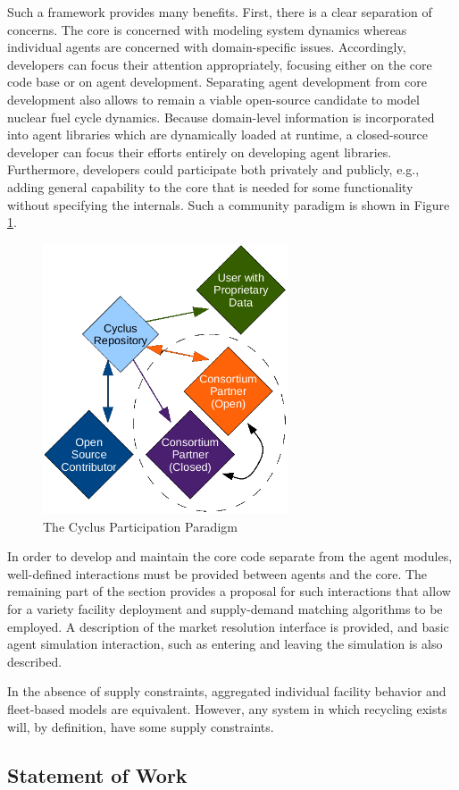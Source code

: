Such a framework provides many benefits. First, there is a clear separation of
concerns. The \Cyclus core is concerned with modeling system dynamics whereas
individual agents are concerned with domain-specific issues. Accordingly,
developers can focus their attention appropriately, focusing either on the core
code base or on agent development. Separating agent development from core
development also allows \Cyclus to remain a viable open-source candidate to
model nuclear fuel cycle dynamics. Because domain-level information is
incorporated into agent libraries which are dynamically loaded at runtime, a
closed-source developer can focus their efforts entirely on developing agent
libraries. Furthermore, developers could participate both privately and
publicly, e.g., adding general capability to the \Cyclus core that is needed for
some functionality without specifying the internals. Such a community paradigm
is shown in Figure \ref{fig:community}.

\begin{figure}[htbp!]
  \begin{center}
    \includegraphics[height=8cm]{./figs/community.png}
  \end{center}
  \caption{The Cyclus Participation Paradigm} 
  \label{fig:community}
\end{figure}

In order to develop and maintain the core code separate from the agent modules,
well-defined interactions must be provided between agents and the \Cyclus
core. The remaining part of the section provides a proposal for such
interactions that allow for a variety facility deployment and supply-demand
matching algorithms to be employed. A description of the market resolution
interface is provided, and basic agent simulation interaction, such as entering
and leaving the simulation is also described.

In the absence of supply constraints, aggregated
individual facility behavior and fleet-based models are equivalent. However, any
system in which recycling exists will, by definition, have some supply
constraints.

\subsection{Statement of Work}
